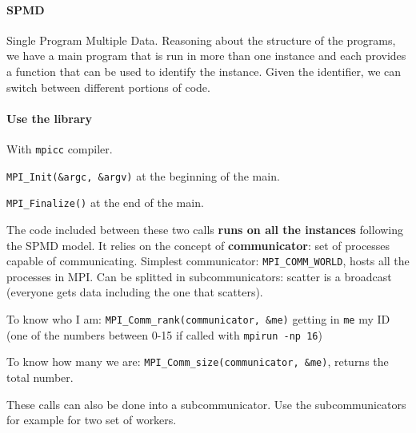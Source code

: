 \documentclass[10pt]{report}
\begin{document}
\paragraph{SPMD} Single Program Multiple Data. Reasoning about the structure of the programs, we have a main program that is run in more than one instance and each provides a function that can be used to identify the instance. Given the identifier, we can switch between different portions of code.
\paragraph{Use the library} With \texttt{mpicc} compiler.\\
\begin{list}{}{}
	\item \texttt{MPI\_Init(\&argc, \&argv)} at the beginning of the main.
	\item \texttt{MPI\_Finalize()} at the end of the main.
\end{list}
The code included between these two calls \textbf{runs on all the instances} following the SPMD model. It relies on the concept of \textbf{communicator}: set of processes capable of communicating. Simplest communicator: \texttt{MPI\_COMM\_WORLD}, hosts all the processes in MPI. Can be splitted in subcommunicators: scatter is a broadcast (everyone gets data including the one that scatters).
\begin{list}{}{}
	\item To know who I am: \texttt{MPI\_Comm\_rank(communicator, \&me)} getting in \texttt{me} my ID (one of the numbers between 0-15 if called with \texttt{mpirun -np 16})
	\item To know how many we are: \texttt{MPI\_Comm\_size(communicator, \&me)}, returns the total number.
\end{list}
These calls can also be done into a subcommunicator. Use the subcommunicators for example for two set of workers.
\end{document}

